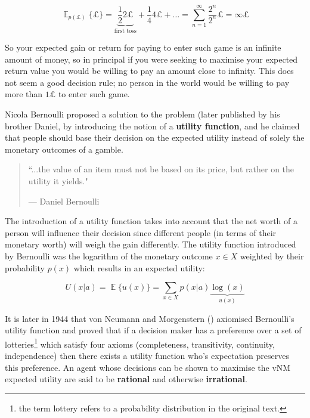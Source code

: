 \begin{equation*}
\displaystyle \mathop{\mathbb{E}}_{p(\pounds)}\{\pounds\} = \underbrace{\frac{1}{2} 2 \pounds}_{\textrm{first toss}} + \frac{1}{4} 4 \pounds + \dots = \sum\limits_{n=1}^{\infty} 
\frac{2^{n}}{2^{n}}\pounds = \infty \pounds 
\end{equation*}

So your expected gain or return for paying to enter such game is an infinite amount of money, so in principal if you were
seeking to maximise your expected return value you would be willing to pay an amount close to infinity. This does not 
seem a good decision rule; no person in the world would be willing to pay more than $1\pounds$ to enter such game.

Nicola Bernoulli proposed a solution to the problem (later published by his brother Daniel, \cite{Bernoulli1954} by introducing the notion 
of a \textbf{utility function}, and he claimed that people should base their decision on the expected utility instead 
of solely the monetary outcomes of a gamble.

\begin{quote}
  \onehalfspacing%
  ``...the value of an item must not be based on its price, but rather on the utility it yields."\par\raggedleft--- \textup{Daniel Bernoulli}
\end{quote}

The introduction of a utility function takes into account that the net worth of a person will influence their decision since 
different people (in terms of their monetary worth) will weigh the gain differently. The utility function introduced by Bernoulli 
was the logarithm of the monetary outcome $x \in X$ weighted by their probability $p(x)$ which results in an expected utility: 

\begin{equation*}\label{eq:exp_utility}
  U(x|a) = \displaystyle \mathop{\mathbb{E}} \{ u(x) \} = \sum_{x\in X} p(x|a) \underbrace{\log(x)}_{u(x)}
\end{equation*}


It is later in 1944 that von Neumann and Morgenstern (\cite{VonNeumann1944}) axiomised Bernoulli's utility function 
and proved that if a decision maker has a preference over a set of lotteries\footnote{the term lottery refers 
to a probability distribution in the original text.} which satisfy four axioms
(completeness, transitivity, continuity, independence) then there exists a utility function who's expectation 
preserves this preference. An agent whose decisions can be shown to maximise the vNM expected utility are said 
to be \textbf{rational} and otherwise \textbf{irrational}.

